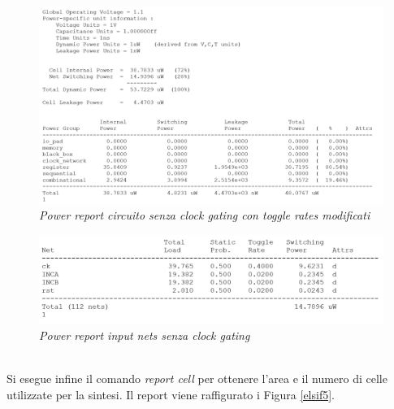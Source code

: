 \begin{figure}[!htb]
	\centering
	\includegraphics[scale=0.65]{immagini/elsif1}
	\caption{\textit{Power report circuito senza clock gating con toggle rates modificati}}
	\label{elsif3}
\end{figure}
\begin{figure}[!htb]
	\centering
	\includegraphics[scale=0.65]{immagini/elsif2}
	\caption{\textit{Power report input nets senza clock gating}}
	\label{elsif4}
\end{figure}
\\
Si esegue infine il comando \textit{report cell} per ottenere l'area e il numero di celle utilizzate per la sintesi. Il report viene raffigurato i Figura \ref{elsif5}. \\
\newpage

